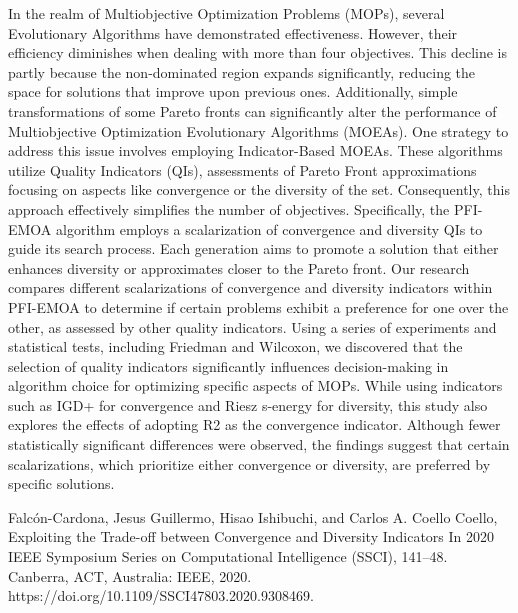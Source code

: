 \documentclass[a4paper,12pt]{article}
\begin{document}
In the realm of Multiobjective Optimization Problems (MOPs), several Evolutionary Algorithms have demonstrated effectiveness. However, their efficiency diminishes when dealing with more than four objectives. This decline is partly because the non-dominated region expands significantly, reducing the space for solutions that improve upon previous ones. Additionally, simple transformations of some Pareto fronts can significantly alter the performance of Multiobjective Optimization Evolutionary Algorithms (MOEAs). One strategy to address this issue involves employing Indicator-Based MOEAs. These algorithms utilize Quality Indicators (QIs), assessments of Pareto Front approximations focusing on aspects like convergence or the diversity of the set. Consequently, this approach effectively simplifies the number of objectives. Specifically, the PFI-EMOA \cite{one} algorithm employs a scalarization of convergence and diversity QIs to guide its search process. Each generation aims to promote a solution that either enhances diversity or approximates closer to the Pareto front. Our research compares different scalarizations of convergence and diversity indicators within PFI-EMOA to determine if certain problems exhibit a preference for one over the other, as assessed by other quality indicators. Using a series of experiments and statistical tests, including Friedman and Wilcoxon, we discovered that the selection of quality indicators significantly influences decision-making in algorithm choice for optimizing specific aspects of MOPs. While using indicators such as IGD+ for convergence and Riesz s-energy for diversity, this study also explores the effects of adopting R2 as the convergence indicator. Although fewer statistically significant differences were observed, the findings suggest that certain scalarizations, which prioritize either convergence or diversity, are preferred by specific solutions.


\begin{thebibliography}{1}

\newblock Falcón-Cardona, Jesus Guillermo, Hisao Ishibuchi, and Carlos A. Coello Coello,
\newblock Exploiting the Trade-off between Convergence and Diversity Indicators
\newblock In 2020 IEEE Symposium Series on Computational Intelligence (SSCI), 141–48. Canberra, ACT, Australia: IEEE, 2020. https://doi.org/10.1109/SSCI47803.2020.9308469.


\end{thebibliography}
\end{document}
